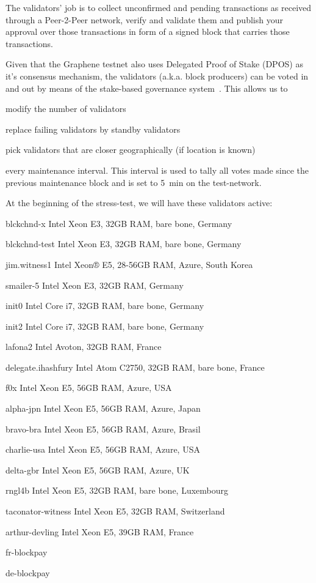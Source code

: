 The validators' job is to collect unconfirmed and pending transactions as
received through a Peer-2-Peer network, verify and validate them and publish
your approval over those transactions in form of a signed block that carries
those transactions.

Given that the Graphene testnet also uses Delegated Proof of Stake (DPOS) as
it's consensus mechanism, the validators (a.k.a. block producers) can be voted
in and out by means of the stake-based governance system~\cite{bts:general}.
This allows us to 
\begin{inparaenum}
 \item modify the number of validators
 \item replace failing validators by standby validators
 \item pick validators that are closer geographically (if location is known)
\end{inparaenum}
every maintenance interval. This interval is used to tally all votes made
since the previous maintenance block and is set to \SI{5}{min} on the
test-network.

At the beginning of the stress-test, we will have these validators active:

\begin{compactdesc}
 \item[blckchnd-x] Intel Xeon E3, 32GB RAM, bare bone, Germany
 \item[blckchnd-test] Intel Xeon E3, 32GB RAM, bare bone, Germany
 \item[jim.witness1] Intel Xeon® E5, 28-56GB RAM, Azure, South Korea
 \item[smailer-5]  Intel Xeon E3, 32GB RAM, Germany
 \item[init0] Intel Core i7, 32GB RAM, bare bone, Germany
 \item[init2] Intel Core i7, 32GB RAM, bare bone, Germany
 \item[lafona2] Intel Avoton, 32GB RAM, France
 \item[delegate.ihashfury] Intel Atom C2750, 32GB RAM, bare bone, France
 \item[f0x] Intel Xeon E5, 56GB RAM, Azure, USA
 \item[alpha-jpn] Intel Xeon E5, 56GB RAM, Azure, Japan
 \item[bravo-bra] Intel Xeon E5, 56GB RAM, Azure, Brasil
 \item[charlie-usa] Intel Xeon E5, 56GB RAM, Azure, USA
 \item[delta-gbr] Intel Xeon E5, 56GB RAM, Azure, UK
 \item[rngl4b] Intel Xeon E5, 32GB RAM, bare bone, Luxembourg
 \item[taconator-witness] Intel Xeon E5, 32GB RAM, Switzerland
 \item[arthur-devling] Intel Xeon E5, 39GB RAM, France
 \item[fr-blockpay] 
 \item[de-blockpay] 
\end{compactdesc}
